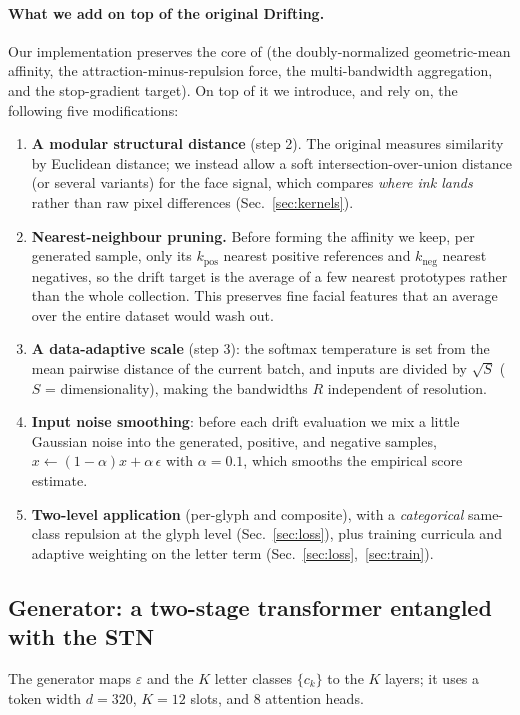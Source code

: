 \documentclass{article}
\begin{document}
\paragraph{What we add on top of the original Drifting.}
Our implementation preserves the core of \citet{lambert2026drifting} (the doubly-normalized
geometric-mean affinity, the attraction-minus-repulsion force, the multi-bandwidth aggregation, and
the stop-gradient target). On top of it we introduce, and rely on, the following five modifications:
\begin{enumerate}\itemsep1pt
\item \textbf{A modular structural distance} (step 2). The original measures similarity by Euclidean
distance; we instead allow a soft intersection-over-union distance (or several variants) for the face
signal, which compares \emph{where ink lands} rather than raw pixel differences
(Sec.~\ref{sec:kernels}).
\item \textbf{Nearest-neighbour pruning.} Before forming the affinity we keep, per generated sample,
only its $k_{\text{pos}}$ nearest positive references and $k_{\text{neg}}$ nearest negatives, so the
drift target is the average of a few nearest prototypes rather than the whole collection. This
preserves fine facial features that an average over the entire dataset would wash out.
\item \textbf{A data-adaptive scale} (step 3): the softmax temperature is set from the mean pairwise
distance of the current batch, and inputs are divided by $\sqrt{S}$ ($S$ = dimensionality), making the
bandwidths $R$ independent of resolution.
\item \textbf{Input noise smoothing}: before each drift evaluation we mix a little Gaussian noise into
the generated, positive, and negative samples, $x\leftarrow(1-\alpha)x + \alpha\,\epsilon$ with
$\alpha{=}0.1$, which smooths the empirical score estimate.
\item \textbf{Two-level application} (per-glyph and composite), with a \emph{categorical} same-class
repulsion at the glyph level (Sec.~\ref{sec:loss}), plus training curricula and adaptive weighting on
the letter term (Sec.~\ref{sec:loss},~\ref{sec:train}).
\end{enumerate}

\subsection{Generator: a two-stage transformer entangled with the STN}
\label{sec:arch}
The generator maps $\varepsilon$ and the $K$ letter classes $\{c_k\}$ to the $K$ layers; it uses a
token width $d{=}320$, $K{=}12$ slots, and $8$ attention heads.
\end{document}
